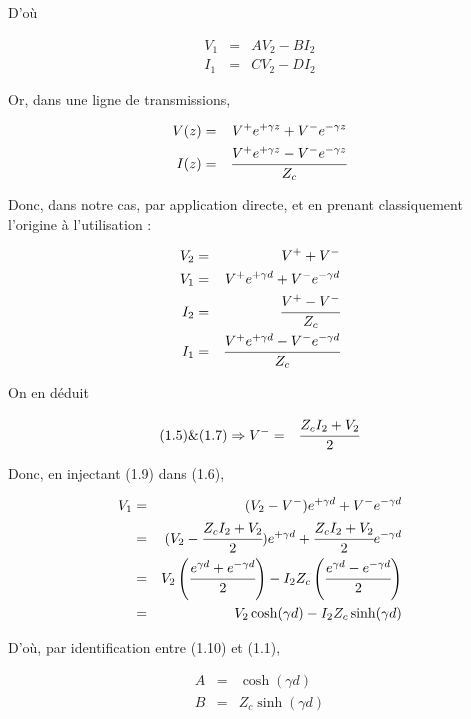 \documentclass[10pt]{article}
\begin{document}
\begin{itemize}
        D'où

        \begin{eqnarray}
            V_1 &=& A V_2 - B I_2 \\
            I_1 &=& C V_2 - D I_2
        \end{eqnarray}

        Or, dans une ligne de transmissions, 

        \begin{eqnarray}
            V(z) &=& V^+ e^{+\gamma z} +V^- e^{-\gamma z} \\
            I(z) &=& \cfrac{V^+ e^{+\gamma z} -V^- e^{-\gamma z}}{Z_c}
        \end{eqnarray}

        Donc, dans notre cas, par application directe, et en prenant classiquement l'origine à l'utilisation :

        \begin{eqnarray}
            V_2 &=& V^+ + V^- \\
            V_1 &=& V^+ e^{+\gamma d} +V^- e^{-\gamma d} \\
            I_2 &=& \cfrac{V^+ -V^- }{Z_c}\\
            I_1 &=& \cfrac{V^+ e^{+\gamma d} -V^- e^{-\gamma d}}{Z_c}
        \end{eqnarray}

        On en déduit

        \begin{eqnarray}
            (1.5) \& (1.7) \Rightarrow V^- &=& \cfrac{Z_c I_2 + V_2}{2}
        \end{eqnarray}

        Donc, en injectant (1.9) dans (1.6),

        \begin{eqnarray}
            V_1 &=& (V_2 - V^-) e^{+\gamma d} + V^- e^{-\gamma d} \nonumber \\
            &=& (V_2 - \cfrac{Z_c I_2 + V_2}{2}) e^{+\gamma d} + \cfrac{Z_c I_2 + V_2}{2} e^{-\gamma d} \nonumber \\
            &=& V_2 \left(\cfrac{e^{\gamma d} + e^{-\gamma d}}{2}\right) - I_2 Z_c \left(\cfrac{e^{\gamma d} - e^{-\gamma d}}{2}\right) \nonumber \\
            &=& V_2 \cosh(\gamma d) - I_2 Z_c \sinh(\gamma d)
        \end{eqnarray}

        D'où, par identification entre (1.10) et (1.1),

        \begin{eqnarray}
            A &=& \cosh(\gamma d) \\
            B &=& Z_c \sinh(\gamma d)
        \end{eqnarray}


\end{itemize}
\end{document}
